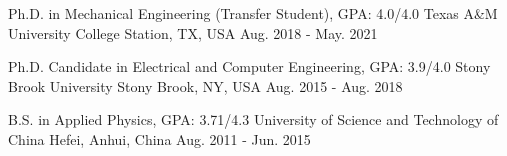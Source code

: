 

\begin{cventries}

  \cventry
    {Ph.D. in Mechanical Engineering (Transfer Student), GPA: 4.0/4.0} %
    {Texas A\&M University} %
    {College Station, TX, USA} %
    {Aug. 2018 - May. 2021} %
    {}

  \cventry
    {Ph.D. Candidate in Electrical and Computer Engineering, GPA: 3.9/4.0} %
    {Stony Brook University} %
    {Stony Brook, NY, USA} %
    {Aug. 2015 - Aug. 2018} %
    {}

  \cventry
    {B.S. in Applied Physics, GPA: 3.71/4.3} %
    {University of Science and Technology of China} %
    {Hefei, Anhui, China} %
    {Aug. 2011 - Jun. 2015} %
    {}

\end{cventries}
